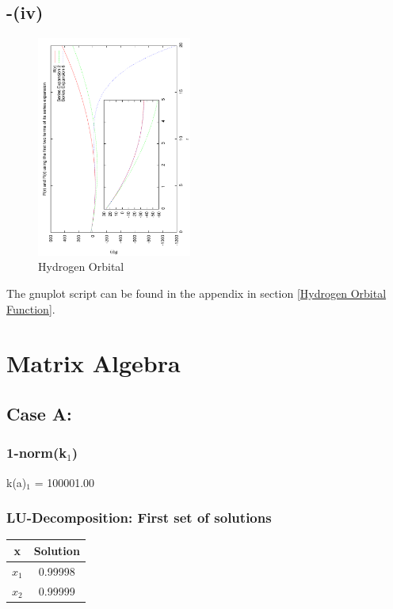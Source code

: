 \documentclass[twocolumn]{article}
\begin{document}
\subsection*{-(iv)}
\begin{figure}
\begin{center}
\includegraphics[width=2.0in, angle=270]{Hydrogen.pdf}
\caption{Hydrogen Orbital}
\label{Hydrogen_Orbital}
\end{center}
\end{figure}
The gnuplot script can be found in the appendix in section \ref{Hydrogen Orbital Function}.


\section{Matrix Algebra}
\subsection{Case A:}
\subsubsection{1-norm(k$_1$)}
k(a)$_1$ =    100001.00 \\
\newline
\subsubsection{LU-Decomposition: First set of solutions}

\begin{table}[h!]
  \centering
  \begin{tabular}{|c|c|} \hline
x & Solution\\ \hline \hline
$x_1$ & 0.99998 \\ \hline
$x_2$ & 0.99999 \\ \hline
\end{tabular}
\centering
\end{table}
\end{document}
